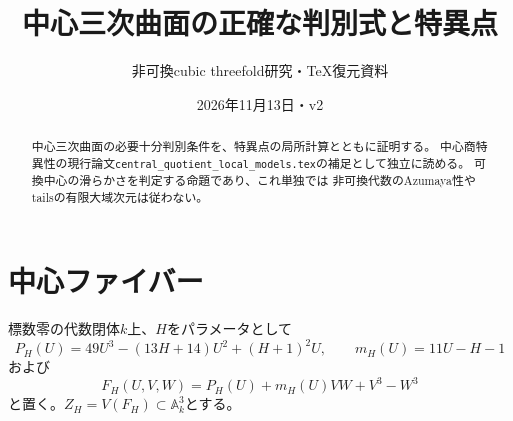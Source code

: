 \documentclass[a4paper,11pt]{ltjsarticle}
\title{中心三次曲面の正確な判別式と特異点}
\author{非可換cubic threefold研究・TeX復元資料}
\date{2026年11月13日・v2}
\begin{document}
\maketitle
\begin{abstract}
中心三次曲面の必要十分判別条件を、特異点の局所計算とともに証明する。
中心商特異性の現行論文\texttt{central\_quotient\_local\_models.tex}の補足として独立に読める。
可換中心の滑らかさを判定する命題であり、これ単独では
非可換代数のAzumaya性やtailsの有限大域次元は従わない。
\end{abstract}
\section{中心ファイバー}
標数零の代数閉体$k$上、$H$をパラメータとして
\[
P_H(U)=49U^3-(13H+14)U^2+(H+1)^2U,\qquad
m_H(U)=11U-H-1
\]
および
\[
F_H(U,V,W)=P_H(U)+m_H(U)VW+V^3-W^3
\]
と置く。$Z_H=V(F_H)\subset\mathbb A^3_k$とする。
\end{document}
